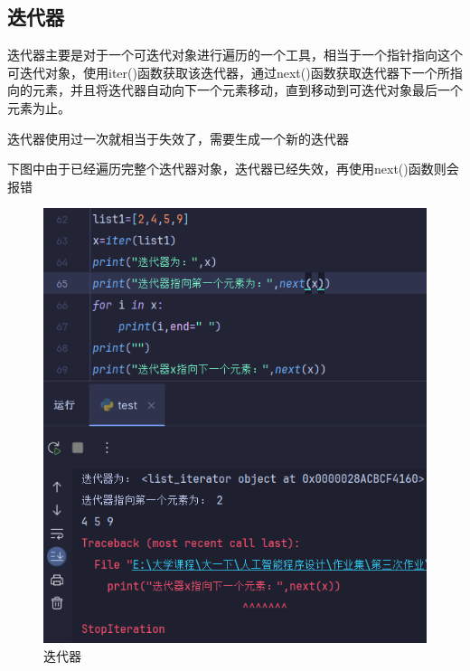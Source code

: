 \documentclass[10pt]{article}
\begin{document}
	\subsection{迭代器}
	迭代器主要是对于一个可迭代对象进行遍历的一个工具，相当于一个指针指向这个可迭代对象，使用iter()函数获取该迭代器，通过next()函数获取迭代器下一个所指向的元素，并且将迭代器自动向下一个元素移动，直到移动到可迭代对象最后一个元素为止。\par
	迭代器使用过一次就相当于失效了，需要生成一个新的迭代器\par
	下图中由于已经遍历完整个迭代器对象，迭代器已经失效，再使用next()函数则会报错
	\begin{figure}[H]
		\centering
		\includegraphics[scale=0.9]{迭代器}
		\caption{迭代器}
	\end{figure}
\end{document}

